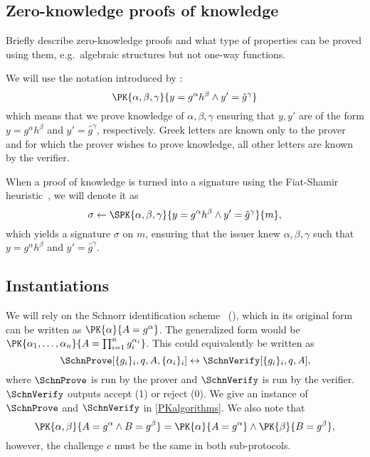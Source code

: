 \subsection{Zero-knowledge proofs of knowledge}%
\label{ZKPK}

Briefly describe zero-knowledge proofs and what type of properties can be proved 
using them, e.g.\ algebraic structures but not one-way functions.

We will use the notation introduced by \citet{PKnotation}:
\begin{equation}\label{PKexample}
  \PK{\alpha, \beta, \gamma}
  {y = g^\alpha h^\beta \land y' = \hat g^\gamma}
\end{equation}
which means that we prove knowledge of \(\alpha, \beta, \gamma\) ensuring that 
\(y, y'\) are of the form \(y = g^\alpha h^\beta\) and \(y' = \hat g^\gamma\), 
respectively.
Greek letters are known only to the prover and for which the prover wishes to 
prove knowledge, all other letters are known by the verifier.

When a proof of knowledge is turned into a signature using the Fiat-Shamir 
heuristic~\cite{FiatShamirHeuristic}, we will denote it as
\begin{equation*}\label{SPKexample}
  \sigma\gets \SPK{\alpha, \beta, \gamma}
  {y = g^\alpha h^\beta \land y' = \hat g^\gamma}
  {m},
\end{equation*}
which yields a signature \(\sigma\) on \(m\), ensuring that the issuer knew 
\(\alpha, \beta, \gamma\) such that \(y = g^\alpha h^\beta\) and \(y' = 
  \hat{g}^\gamma\).


\subsection{Instantiations}


We will rely on the Schnorr identification scheme~\cite{Schnorr} (\Schn), which 
in its original form can be written as \(\PK{\alpha}{A = g^\alpha}\).
The generalized form would be \(\PK{\alpha_1, \dotsc, \alpha_n}{A = 
    \prod_{i=1}^n g_i^{\alpha_i}}\).
This could equivalently be written as
\begin{equation*}
  \SchnProve[\{g_i\}_i, q, A, \{\alpha_i\}_i] \leftrightarrow
  \SchnVerify[\{g_i\}_i, q, A],
\end{equation*}
where \(\SchnProve\) is run by the prover and \(\SchnVerify\) is run by the 
verifier.
\(\SchnVerify\) outputs accept (1) or reject (0).
We give an instance of \(\SchnProve\) and \(\SchnVerify\) in \cref{PKalgorithms}.
We also note that
\begin{equation*}
  \PK{\alpha, \beta}{A = g^\alpha \land B = g^\beta} = \PK{\alpha}{A = g^\alpha} 
  \land \PK{\beta}{B = g^\beta},
\end{equation*}
however, the challenge \(c\) must be the same in both sub-protocols.

